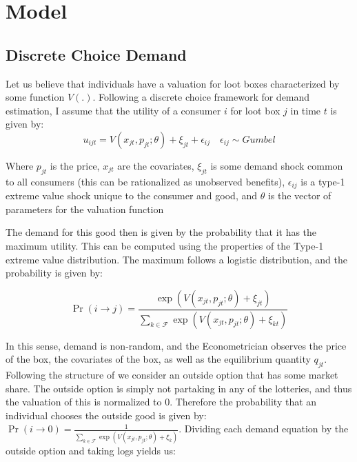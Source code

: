 \documentclass[12pt]{paper}
\begin{document}
\section{Model}



\subsection{Discrete Choice Demand}

Let us believe that individuals have a valuation for loot boxes
characterized by some function $V(.)$. Following a discrete choice
framework for demand estimation, I assume that the utility of a
consumer $i$ for loot box $j$ in time $t$ is given by:
\begin{equation*}
  u_{ijt} = V( x_{jt}, p_{jt}; \theta ) + \xi_{jt} + \epsilon_{ij} \quad \epsilon_{ij} \sim Gumbel
\end{equation*}

Where $p_{jt}$ is the price, $x_{jt}$ are the covariates, $\xi_{jt}$ is
some demand shock common to all consumers (this can be rationalized as
unobserved benefits), $\epsilon_{ij}$ is a type-1 extreme value shock unique
to the consumer and good, and $\theta$ is the vector of parameters for the
valuation function

The demand for this good then is given by the probability that it has
the maximum utility. This can be computed using the properties of the
Type-1 extreme value distribution. The maximum follows a logistic
distribution, and the probability is given by:

\begin{equation*}
  \Pr( i \rightarrow j ) = \frac{\exp( V(x_{jt},p_{jt} ; \theta) + \xi_{jt})}{ \sum_{k \in \mathcal{F}}
    \exp(V(x_{jt},p_{jt}; \theta) + \xi_{kt})}
\end{equation*}

In this sense, demand is non-random, and the Econometrician observes
the price of the box, the covariates of the box, as well as the
equilibrium quantity $q_{jt}$. Following the structure of
\cite{Berry1994} we consider an outside option that has some market
share. The outside option is simply not partaking in any of the
lotteries, and thus the valuation of this is normalized to
$0$. Therefore the probability that an individual chooses the outside
good is given by:
$\Pr( i \rightarrow 0) = \frac{1}{ \sum_{k \in \mathcal{F}} \exp(V(x_{jt},p_{jt}; \theta)
  + \xi_k)}$.  Dividing each demand equation by the outside option and
taking logs yields us:
\end{document}
